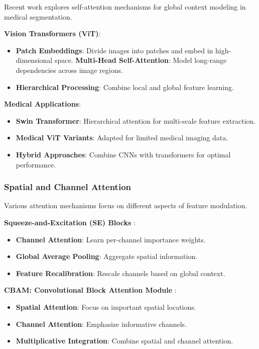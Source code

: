 \documentclass[12pt,a4paper]{article}
\begin{document}
Recent work explores self-attention mechanisms for global context modeling in medical segmentation.

\textbf{Vision Transformers (ViT)}:
\begin{itemize}
    \item \textbf{Patch Embeddings}: Divide images into patches and embed in high-dimensional space.
    \textbf{Multi-Head Self-Attention}: Model long-range dependencies across image regions.
    \item \textbf{Hierarchical Processing}: Combine local and global feature learning.
\end{itemize}

\textbf{Medical Applications}:
\begin{itemize}
    \item \textbf{Swin Transformer}: Hierarchical attention for multi-scale feature extraction.
    \item \textbf{Medical ViT Variants}: Adapted for limited medical imaging data.
    \item \textbf{Hybrid Approaches}: Combine CNNs with transformers for optimal performance.
\end{itemize}

\subsubsection{Spatial and Channel Attention}

Various attention mechanisms focus on different aspects of feature modulation.

\textbf{Squeeze-and-Excitation (SE) Blocks} \cite{hu2018squeeze}:
\begin{itemize}
    \item \textbf{Channel Attention}: Learn per-channel importance weights.
    \item \textbf{Global Average Pooling}: Aggregate spatial information.
    \item \textbf{Feature Recalibration}: Rescale channels based on global context.
\end{itemize}

\textbf{CBAM: Convolutional Block Attention Module} \cite{woo2018cbam}:
\begin{itemize}
    \item \textbf{Spatial Attention}: Focus on important spatial locations.
    \item \textbf{Channel Attention}: Emphasize informative channels.
    \item \textbf{Multiplicative Integration}: Combine spatial and channel attention.
\end{itemize}
\end{document}
